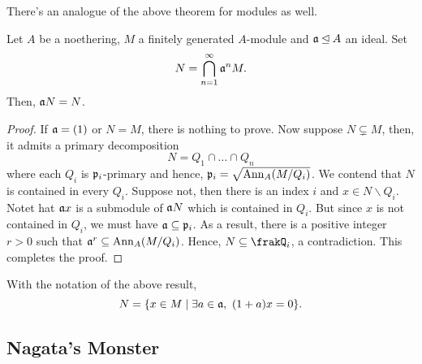 There's an analogue of the above theorem for modules as well. 

\begin{theorem}
    Let $A$ be a noethering, $M$ a finitely generated $A$-module and $\mathfrak a\unlhd A$ an ideal. Set 
    \begin{equation*}
        N = \bigcap_{n = 1}^\infty\mathfrak a^n M.
    \end{equation*}
    Then, $\mathfrak a N = N$.
\end{theorem}
\begin{proof}
    If $\mathfrak a = (1)$ or $N = M$, there is nothing to prove. Now suppose $N\subsetneq M$, then, it admits a primary decomposition 
    \begin{equation*}
        N = Q_1\cap\dots\cap Q_n
    \end{equation*}
    where each $Q_i$ is $\mathfrak p_i$-primary and hence, $\mathfrak p_i = \sqrt{\operatorname{Ann}_A(M/Q_i)}$. We contend that $N$ is contained in every $Q_i$. Suppose not, then there is an index $i$ and $x\in N\backslash Q_i$. Notet hat $\mathfrak a x$ is a submodule of $\mathfrak a N$ which is contained in $Q_i$. But since $x$ is not contained in $Q_i$, we must have $\mathfrak a\subseteq\mathfrak p_i$. As a result, there is a positive integer $r > 0$ such that $\mathfrak a^r\subseteq\operatorname{Ann}_A(M/Q_i)$. Hence, $N\subseteq\frakQ_i$, a contradiction. This completes the proof.
\end{proof}

\begin{corollary}
    With the notation of the above result, 
    \begin{equation*}
        N = \{x\in M\mid\exists a\in\mathfrak a,~(1 + a)x = 0\}.
    \end{equation*}
\end{corollary}

\subsection{Nagata's Monster}


